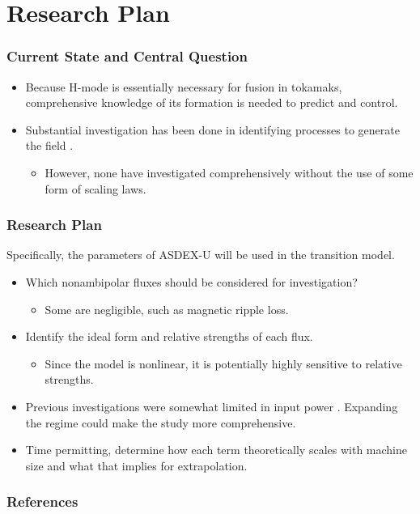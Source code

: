 \documentclass{beamer}
\begin{document}

\section{Research Plan}
\begin{frame}
\frametitle{Current State and Central Question}
\begin{itemize}
	\item Because H-mode is essentially necessary for fusion in tokamaks, comprehensive knowledge of its formation is needed to predict and control.
	\item Substantial investigation has been done in identifying processes to generate the field \parencite{connor_review_2000}.
	\begin{itemize}
		\item However, none have investigated comprehensively without the use of some form of scaling laws.
	\end{itemize}
\end{itemize}
\vfill
{}
\end{frame}

\begin{frame}
\frametitle{Research Plan}
Specifically, the parameters of ASDEX-U will be used in the transition model.
\begin{itemize}
	\item Which nonambipolar fluxes should be considered for investigation?
	\begin{itemize}
		\item Some are negligible, such as magnetic ripple loss.
	\end{itemize}
	\item Identify the ideal form and relative strengths of each flux.
	\begin{itemize}
		\item Since the model is nonlinear, it is potentially highly sensitive to relative strengths.
	\end{itemize}
	\item Previous investigations were somewhat limited in input power \parencite{staps_backstepping_2017}. Expanding the regime could make the study more comprehensive.
	\item Time permitting, determine how each term theoretically scales with machine size and what that implies for extrapolation.
\end{itemize}
\end{frame}


\begin{frame}
\frametitle{References}
\renewcommand*{\bibfont}{\tiny}
\printbibliography
\end{frame}
\end{document}
